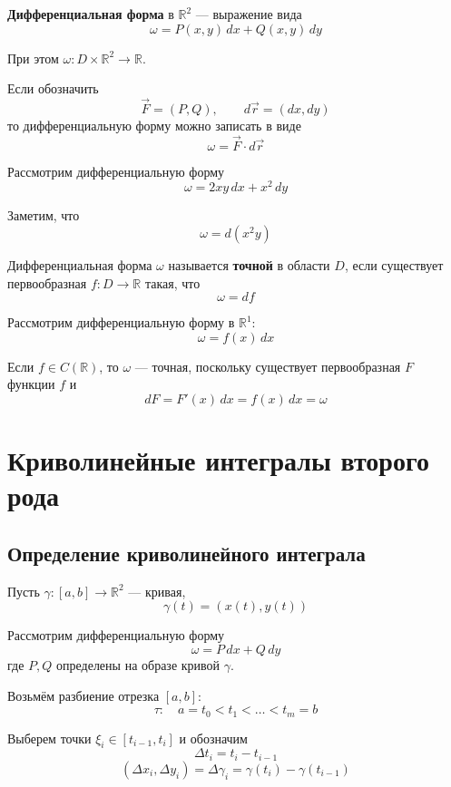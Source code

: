 \documentclass[12pt,a4paper]{article}
\begin{document}
\begin{definition}
\textbf{Дифференциальная форма} в $\mathbb{R}^2$ — выражение вида
\[
\omega = P(x,y)\,dx + Q(x,y)\,dy
\]

При этом $\omega \colon D \times \mathbb{R}^2 \to \mathbb{R}$.

Если обозначить
\[
\vec{F}=(P,Q), \qquad d\vec{r}=(dx,dy)
\]
то дифференциальную форму можно записать в виде
\[
\omega = \vec{F}\cdot d\vec{r}
\]
\end{definition}

\begin{example}
Рассмотрим дифференциальную форму
\[
\omega = 2xy\,dx + x^2\,dy
\]

Заметим, что
\[
\omega = d(x^2y)
\]
\end{example}

\begin{definition}
Дифференциальная форма $\omega$ называется \textbf{точной} в области $D$, если существует первообразная $f \colon D \to \mathbb{R}$ такая, что
\[
\omega = df
\]
\end{definition}

\begin{example}
Рассмотрим дифференциальную форму в $\mathbb{R}^1$:
\[
\omega = f(x)\,dx
\]

Если $f \in C(\mathbb{R})$, то $\omega$ — точная, поскольку существует первообразная $F$ функции $f$ и
\[
dF = F'(x)\,dx = f(x)\,dx = \omega
\]
\end{example}

\newpage

\section{Криволинейные интегралы второго рода}

\subsection{Определение криволинейного интеграла}

Пусть $\gamma \colon [a,b]\to\mathbb{R}^2$ — кривая,
\[
\gamma(t)=(x(t),y(t))
\]

Рассмотрим дифференциальную форму
\[
\omega=P\,dx+Q\,dy
\]
где $P,Q$ определены на образе кривой $\gamma$.

Возьмём разбиение отрезка $[a,b]$:
\[
\tau:\quad a=t_0<t_1<\ldots<t_m=b
\]

Выберем точки $\xi_i\in[t_{i-1},t_i]$ и обозначим
\[
\Delta t_i=t_i-t_{i-1}
\]
\[
(\Delta x_i,\Delta y_i)
=\Delta\gamma_i
=\gamma(t_i)-\gamma(t_{i-1})
\]
\end{document}
